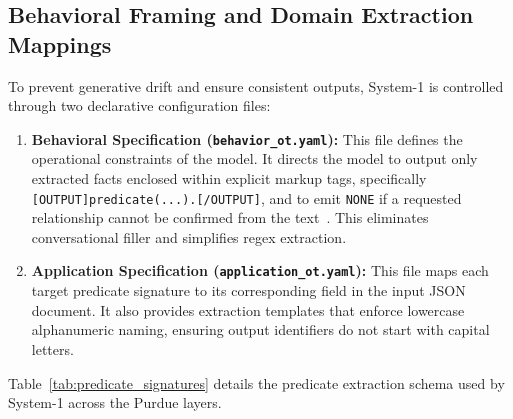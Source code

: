 \documentclass[target=mst,aauheader=aics,style=]{thud}
\begin{document}
\subsection{Behavioral Framing and Domain Extraction Mappings}
To prevent generative drift and ensure consistent outputs, System-1 is controlled through two declarative configuration files:
\begin{enumerate}
    \item \textbf{Behavioral Specification (\texttt{behavior\_ot.yaml}):} This file defines the operational constraints of the model. It directs the model to output only extracted facts enclosed within explicit markup tags, specifically \texttt{[OUTPUT]predicate(...).[/OUTPUT]}, and to emit \texttt{NONE} if a requested relationship cannot be confirmed from the text~\cite{alviano2025llmasp}. This eliminates conversational filler and simplifies regex extraction.
    \item \textbf{Application Specification (\texttt{application\_ot.yaml}):} This file maps each target predicate signature to its corresponding field in the input JSON document. It also provides extraction templates that enforce lowercase alphanumeric naming, ensuring output identifiers do not start with capital letters.
\end{enumerate}

Table~\ref{tab:predicate_signatures} details the predicate extraction schema used by System-1 across the Purdue layers.
\end{document}
